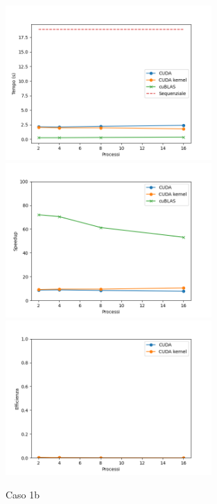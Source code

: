 \begin{figure}[ht]
    \centering
    \includegraphics[width=0.7\textwidth]{./imgs/graphs/caso_a1.png}
    \includegraphics[width=0.7\textwidth]{./imgs/graphs/caso_a1_speedup.png}
    \includegraphics[width=0.7\textwidth]{./imgs/graphs/caso_a1_efficiency.png}
    \caption{Caso 1b}
\end{figure}

